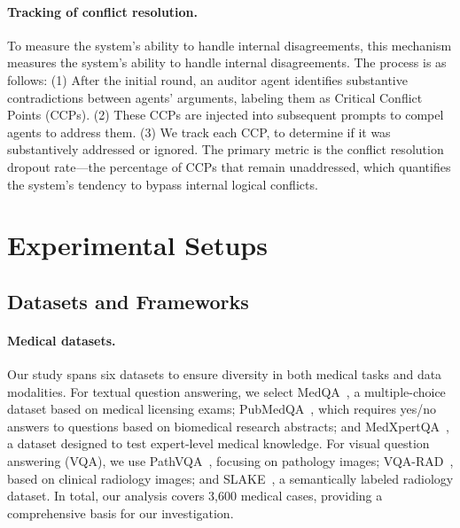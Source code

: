 \paragraph{Tracking of conflict resolution.}
To measure the system's ability to handle internal disagreements, this mechanism measures the system's ability to handle internal disagreements. The process is as follows: (1) After the initial round, an auditor agent identifies substantive contradictions between agents' arguments, labeling them as Critical Conflict Points (CCPs). (2) These CCPs are injected into subsequent prompts to compel agents to address them. (3) We track each CCP, to determine if it was substantively addressed or ignored. The primary metric is the conflict resolution dropout rate—the percentage of CCPs that remain unaddressed, which quantifies the system's tendency to bypass internal logical conflicts.

\section{Experimental Setups}

\subsection{Datasets and Frameworks}

\paragraph{Medical datasets.}
Our study spans six datasets to ensure diversity in both medical tasks and data modalities. For textual question answering, we select MedQA~\cite{jin2021medqa}, a multiple-choice dataset based on medical licensing exams; PubMedQA~\cite{jin2019pubmedqa}, which requires yes/no answers to questions based on biomedical research abstracts; and MedXpertQA~\cite{zuo2025medxpertqa}, a dataset designed to test expert-level medical knowledge. For visual question answering (VQA), we use PathVQA~\cite{he2020pathvqa}, focusing on pathology images; VQA-RAD~\cite{lau2018VQA_RAD}, based on clinical radiology images; and SLAKE~\cite{liu2021slake}, a semantically labeled radiology dataset. In total, our analysis covers 3,600 medical cases, providing a comprehensive basis for our investigation.

